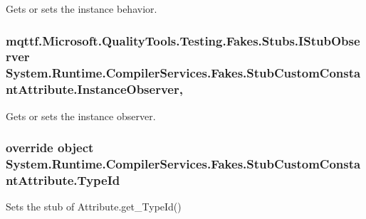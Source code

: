 Gets or sets the instance behavior.

\hypertarget{class_system_1_1_runtime_1_1_compiler_services_1_1_fakes_1_1_stub_custom_constant_attribute_a0f0144532873486319591d0bde9b2f53}{
\subsubsection[{Instance\-Observer}]{\setlength{\rightskip}{0pt plus 5cm}mqttf.\-Microsoft.\-Quality\-Tools.\-Testing.\-Fakes.\-Stubs.\-I\-Stub\-Observer System.\-Runtime.\-Compiler\-Services.\-Fakes.\-Stub\-Custom\-Constant\-Attribute.\-Instance\-Observer\hspace{0.3cm}{\ttfamily [get]}, {\ttfamily [set]}}}\label{class_system_1_1_runtime_1_1_compiler_services_1_1_fakes_1_1_stub_custom_constant_attribute_a0f0144532873486319591d0bde9b2f53}


Gets or sets the instance observer.

\hypertarget{class_system_1_1_runtime_1_1_compiler_services_1_1_fakes_1_1_stub_custom_constant_attribute_a6a2dd33efd85cefb0ff9ec2c7585818e}{
\subsubsection[{Type\-Id}]{\setlength{\rightskip}{0pt plus 5cm}override object System.\-Runtime.\-Compiler\-Services.\-Fakes.\-Stub\-Custom\-Constant\-Attribute.\-Type\-Id\hspace{0.3cm}{\ttfamily [get]}}}\label{class_system_1_1_runtime_1_1_compiler_services_1_1_fakes_1_1_stub_custom_constant_attribute_a6a2dd33efd85cefb0ff9ec2c7585818e}


Sets the stub of Attribute.\-get\-\_\-\-Type\-Id()

